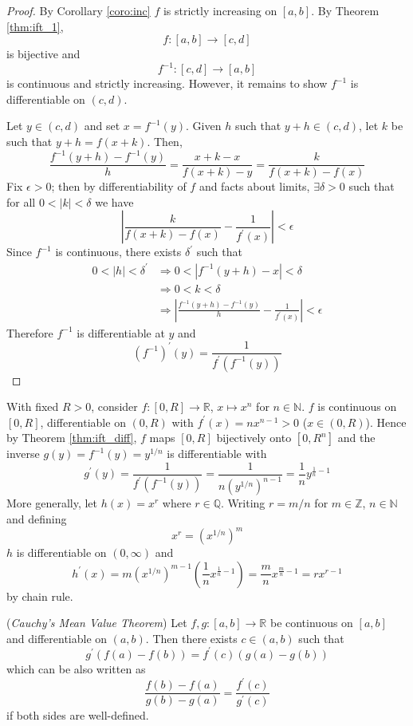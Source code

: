 \documentclass[10pt, a4paper, twoside]{report}
\begin{document}
\begin{proof}
    By Corollary \ref{coro:inc} \(f\) is strictly increasing on \([a,b]\). By Theorem \ref{thm:ift_1}, 
    \[f:[a,b]\to[c,d]\]
    is bijective and 
    \[f^{-1}:[c,d]\to[a,b]\]
    is continuous and strictly increasing. However, it remains to show \(f^{-1}\) is differentiable on \((c,d)\).

    Let \(y\in(c,d)\) and set \(x=f^{-1}(y)\). Given \(h\) such that \(y+h\in(c,d)\), let \(k\) be such that \(y+h=f(x+k)\). Then,
    \[\frac{f^{-1}(y+h)-f^{-1}(y)}{h}=\frac{x+k-x}{f(x+k)-y}=\frac{k}{f(x+k)-f(x)}\]
    Fix \(\epsilon>0\); then by differentiability of \(f\) and facts about limits, \(\exists\delta>0\) such that for all \(0<|k|<\delta\) we have 
    \[\left|\frac{k}{f(x+k)-f(x)}-\frac{1}{f^\prime(x)}\right|<\epsilon\] 
    Since \(f^{-1}\) is continuous, there exists \(\delta^\prime\) such that 
    \begin{align*}
        0<|h|<\delta^\prime&\Rightarrow 0<|f^{-1}(y+h)-x|<\delta \\
        &\Rightarrow 0<k<\delta \\
        &\Rightarrow \left|\frac{f^{-1}(y+h)-f^{-1}(y)}h-\frac{1}{f^\prime(x)}\right|<\epsilon
    \end{align*}
    Therefore \(f^{-1}\) is differentiable at \(y\) and 
    \[(f^{-1})^\prime(y)=\frac{1}{f^\prime(f^{-1}(y))}\]
\end{proof}
With fixed \(R>0\), consider \(f:[0,R]\to\mathbb{R}\), \(x\mapsto x^n\) for \(n\in\mathbb{N}\). \(f\) is continuous on \([0,R]\), differentiable on \((0,R)\) with \(f^\prime(x)=nx^{n-1}>0\) (\(x\in(0,R)\)). Hence by Theorem \ref{thm:ift_diff}, \(f\) maps \([0,R]\) bijectively onto \([0,R^n]\) and the inverse \(g(y)=f^{-1}(y)=y^{1/n}\) is differentiable with 
\[g^\prime(y)=\frac{1}{f^\prime(f^{-1}(y))}=\frac{1}{n(y^{1/n})^{n-1}}=\frac 1ny^{\frac 1n-1}\]
More generally, let \(h(x)=x^r\) where \(r\in\mathbb{Q}\). Writing \(r=m/n\) for \(m\in\mathbb{Z}\), \(n\in\mathbb{N}\) and defining 
\[x^r=\left(x^{1/n}\right)^m\]
\(h\) is differentiable on \((0,\infty)\) and 
\[h^\prime(x)=m\left(x^{1/n}\right)^{m-1}\left(\frac 1nx^{\frac 1n-1}\right)=\frac mnx^{\frac mn-1}=rx^{r-1}\]
by chain rule.
\begin{theorem}
    (\emph{Cauchy's Mean Value Theorem}) Let \(f,g:[a,b]\to\mathbb{R}\) be continuous on \([a,b]\) and differentiable on \((a,b)\). Then there exists \(c\in(a,b)\) such that 
    \[g^\prime(f(a)-f(b))=f^\prime(c)(g(a)-g(b))\]
    which can be also written as 
    \[\frac{f(b)-f(a)}{g(b)-g(a)}=\frac{f^\prime(c)}{g^\prime(c)}\]
    if both sides are well-defined.
    \label{thm:mvt_cauchy}
\end{theorem}
\end{document}
